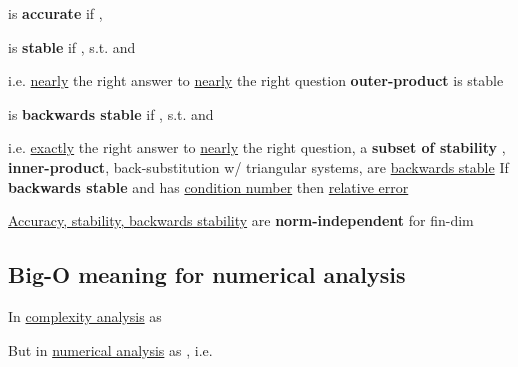  is \textbf{accurate} if ,

 is \textbf{stable} if ,
 s.t.
and

\begin{itemize}

      \vItem
            i.e. \underline{nearly} the right answer to \underline{nearly} the right question
      \vItem
            \textbf{outer-product} is stable
\end{itemize}

 is \textbf{backwards stable} if
,  s.t.
 and

\begin{itemize}

      \vItem
            i.e. \underline{exactly} the right answer to \underline{nearly} the right question,
            a \textbf{subset of stability}
      \vItem
            \iMbox{\oplus, \ominus, \otimes, \oslash}, \textbf{inner-product},
            back-substitution w/ triangular systems, are \underline{backwards stable}
      \vItem
            If \textbf{backwards stable}  and  has
            \underline{condition number}  then \underline{relative error}
\end{itemize}

\underline{Accuracy, stability, backwards stability} are \textbf{norm-independent} for fin-dim 

\subsection*{Big-O meaning for numerical analysis}

In \underline{complexity analysis}  as 

But in \underline{numerical analysis}  as ,
i.e. 

